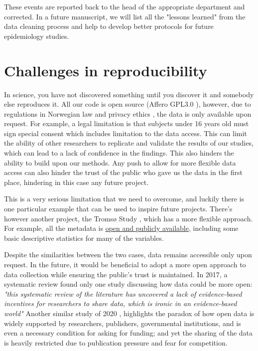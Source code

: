 These events are reported back to the head of the appropriate department and corrected. In a future manuscript, we will list all the "lessons learned" from the data cleaning process and help to develop better protocols for future epidemiology studies.

\section{Challenges in reproducibility}

In science, you have not discovered something until you discover it and somebody else reproduces it. All our code is open source (Affero GPL3.0 \cite{ref:afferoGPL}), however, due to regulations in Norwegian law \cite{NorwayLaw1} and privacy ethics \cite{NorwayLaw2}, the data is only available upon request. For example, a legal limitation is that subjects under 16 years old must sign special consent which includes limitation to the data access. This can limit the ability of other researchers to replicate and validate the results of our studies, which can lead to a lack of confidence in the findings. This also hinders the ability to build upon our methods. Any push to allow for more flexible data access can also hinder the trust of the public who gave us the data in the first place, hindering in this case any future project.

This is a very serious limitation that we need to overcome, and luckily there is one particular example that can be used to inspire future projects. There's however another project, the Tromsø Study \cite{TTStudyA}, which has a more flexible approach. For example, all the metadata is \href{https://helsedata.no/en/variables/?datakilde=K_TR&page=search}{open and publicly available}, including some basic descriptive statistics for many of the variables.

Despite the similarities between the two cases, data remains accessible only upon request. In the future, it would be beneficial to adopt a more open approach to data collection while ensuring the public's trust is maintained. In 2017, a systematic review found only one study discussing how data could be more open: \textit{"this systematic review of the literature has uncovered a lack of evidence-based incentives for researchers to share data, which is ironic in an evidence-based world"}\cite{RowhaniFarid2017} Another similar study of 2020 \cite{Hulsen2020}, highlights the paradox of how open data is widely supported by researchers, publishers, governmental institutions, and is even a necessary condition for asking for funding; and yet the sharing of the data is heavily restricted due to publication pressure and fear for competition.

